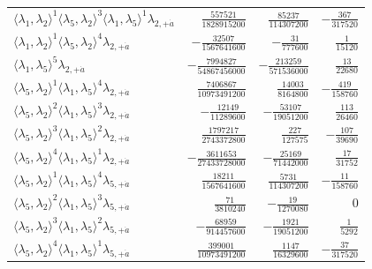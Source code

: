 \begin{longtable}{@{}lrrr@{}}
$\langle\lambda_1,\lambda_2\rangle^{1}\langle\lambda_5,\lambda_2\rangle^{3}\langle\lambda_1,\lambda_5\rangle^{1}\lambda_{2,+\dot a}$ & $\frac{557521}{1828915200}$ & $\frac{85237}{114307200}$ & $-\frac{367}{317520}$ \\
$\langle\lambda_1,\lambda_2\rangle^{1}\langle\lambda_5,\lambda_2\rangle^{4}\lambda_{2,+\dot a}$ & $-\frac{32507}{1567641600}$ & $-\frac{31}{777600}$ & $\frac{1}{15120}$ \\
$\langle\lambda_1,\lambda_5\rangle^{5}\lambda_{2,+\dot a}$ & $-\frac{7994827}{54867456000}$ & $-\frac{213259}{571536000}$ & $\frac{13}{22680}$ \\
$\langle\lambda_5,\lambda_2\rangle^{1}\langle\lambda_1,\lambda_5\rangle^{4}\lambda_{2,+\dot a}$ & $\frac{7406867}{10973491200}$ & $\frac{14003}{8164800}$ & $-\frac{419}{158760}$ \\
$\langle\lambda_5,\lambda_2\rangle^{2}\langle\lambda_1,\lambda_5\rangle^{3}\lambda_{2,+\dot a}$ & $-\frac{12149}{11289600}$ & $-\frac{53107}{19051200}$ & $\frac{113}{26460}$ \\
$\langle\lambda_5,\lambda_2\rangle^{3}\langle\lambda_1,\lambda_5\rangle^{2}\lambda_{2,+\dot a}$ & $\frac{1797217}{2743372800}$ & $\frac{227}{127575}$ & $-\frac{107}{39690}$ \\
$\langle\lambda_5,\lambda_2\rangle^{4}\langle\lambda_1,\lambda_5\rangle^{1}\lambda_{2,+\dot a}$ & $-\frac{3611653}{27433728000}$ & $-\frac{25169}{71442000}$ & $\frac{17}{31752}$ \\
$\langle\lambda_5,\lambda_2\rangle^{1}\langle\lambda_1,\lambda_5\rangle^{4}\lambda_{5,+\dot a}$ & $\frac{18211}{1567641600}$ & $\frac{5731}{114307200}$ & $-\frac{11}{158760}$ \\
$\langle\lambda_5,\lambda_2\rangle^{2}\langle\lambda_1,\lambda_5\rangle^{3}\lambda_{5,+\dot a}$ & $\frac{71}{3810240}$ & $-\frac{19}{1270080}$ & $0$ \\
$\langle\lambda_5,\lambda_2\rangle^{3}\langle\lambda_1,\lambda_5\rangle^{2}\lambda_{5,+\dot a}$ & $-\frac{68959}{914457600}$ & $-\frac{1921}{19051200}$ & $\frac{1}{5292}$ \\
$\langle\lambda_5,\lambda_2\rangle^{4}\langle\lambda_1,\lambda_5\rangle^{1}\lambda_{5,+\dot a}$ & $\frac{399001}{10973491200}$ & $\frac{1147}{16329600}$ & $-\frac{37}{317520}$ \\
\end{longtable}
